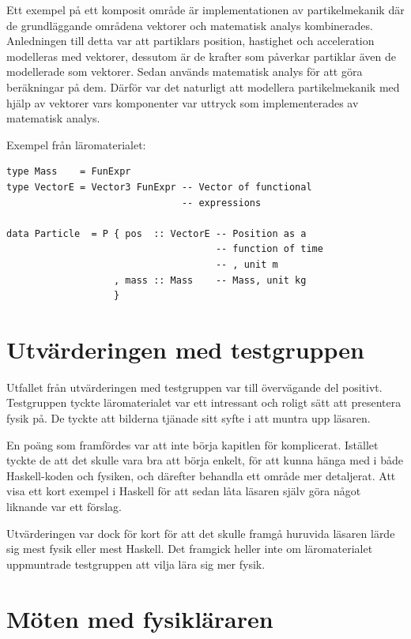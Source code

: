Ett exempel på ett komposit område är implementationen av partikelmekanik
där de grundläggande områdena vektorer och matematisk analys
kombinerades. Anledningen till detta var att partiklars position, hastighet och
acceleration modelleras med vektorer, dessutom är de krafter som påverkar
partiklar även de modellerade som vektorer. Sedan används matematisk analys för att
göra beräkningar på dem. Därför var det naturligt att modellera partikelmekanik
med hjälp av vektorer vars komponenter var uttryck som
implementerades av matematisk analys.

Exempel från läromaterialet:
\begin{lstlisting}[frame=none, belowskip=-0.5\baselineskip, xleftmargin=0.5in]
type Mass    = FunExpr
type VectorE = Vector3 FunExpr -- Vector of functional
                               -- expressions

data Particle  = P { pos  :: VectorE -- Position as a
                                     -- function of time
                                     -- , unit m
                   , mass :: Mass    -- Mass, unit kg
                   }
\end{lstlisting}

\section{Utvärderingen med testgruppen}\label{sec:res_test}

Utfallet från utvärderingen med testgruppen var till övervägande del positivt.
Testgruppen tyckte läromaterialet var ett intressant och roligt sätt att
presentera fysik på. De tyckte att bilderna tjänade sitt syfte i att muntra upp
läsaren. 

En poäng som framfördes var att inte börja kapitlen för komplicerat. Istället
tyckte de att det skulle vara bra att börja enkelt, för att kunna hänga med i
både Haskell-koden och fysiken, och därefter behandla ett område mer
detaljerat. Att visa ett kort exempel i Haskell för att sedan låta läsaren själv
göra något liknande var ett förslag.

Utvärderingen var dock för kort för att det skulle framgå huruvida läsaren lärde
sig mest fysik eller mest Haskell. Det framgick heller inte om läromaterialet
uppmuntrade testgruppen att vilja lära sig mer fysik.

\section{Möten med fysikläraren}\label{sec:res_ake}

